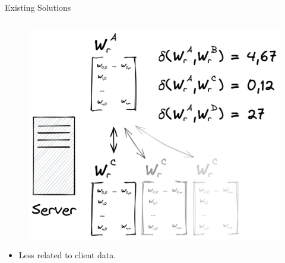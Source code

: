 \begin{frame}{Existing Solutions}
\begin{columns}[T]
{\begin{column}{.33\textwidth}
        \begin{figure}
          \centering
          \includegraphics[height=.36\textheight]{figures/radar/server-side-comp}
        \end{figure}

        \begin{itemize}\smaller
          \item Less related to client data.
        \end{itemize}
      \end{column}%
    }

\end{columns}
\end{frame}
